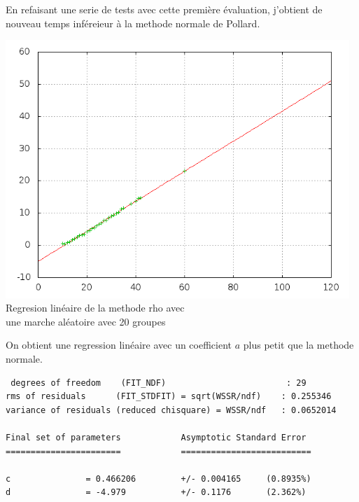 \documentclass[a4paper,10pt]{report}
\begin{document}
En refaisant une serie de tests avec cette première évaluation, j'obtient de nouveau temps inféreieur à la methode normale de Pollard.
\begin{center}
  \includegraphics[width = 13cm]{rho_multi.png}
  Regresion linéaire de la methode rho avec\\
 une marche aléatoire avec 20 groupes
\end{center}

On obtient une regression linéaire avec un coefficient $a$ plus petit que la methode normale.

\begin{verbatim}
 degrees of freedom    (FIT_NDF)                        : 29
rms of residuals      (FIT_STDFIT) = sqrt(WSSR/ndf)    : 0.255346
variance of residuals (reduced chisquare) = WSSR/ndf   : 0.0652014

Final set of parameters            Asymptotic Standard Error
=======================            ==========================

c               = 0.466206         +/- 0.004165     (0.8935%)
d               = -4.979           +/- 0.1176       (2.362%)
\end{verbatim}
\end{document}
